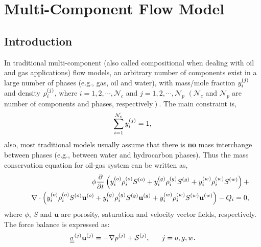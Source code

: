 
\chapter{Multi-Component Flow Model}\label{Chapter:CompositionalModel}


\section{Introduction}\label{Chapter:CompositionalModel:Section:Introduction}
In traditional multi-component (also called compositional when dealing with oil and gas applications) flow models, an arbitrary number of components exist in a large number of phases (e.g., gas, oil and water), with mass/mole fraction $\mfr[y]{i}{j}$ and density $\mfr[\rho]{i}{j}$, where $i = 1, 2, \cdots, \mathcal{N}_{c}$ and $j=1, 2, \cdots, \mathcal{N}_{p}$ $\left(\mathcal{N}_{c}\right.$ and $\mathcal{N}_{p}$ are number of components and phases, respectively$\left.\right)$. The main constraint is,
   \begin{displaymath}
      \summation_{i=1}^{\mathcal{N}_{c}} \mfr[y]{i}{j} = 1,
   \end{displaymath}
also, most traditional models usually assume that there is {\bf no} mass interchange between phases (e.g., between water and hydrocarbon phases). Thus the mass conservation equation for oil-gas system can be written as,
   \begin{eqnarray}
      &&\phi \frc{\partial}{\partial t}\left( \mfr[y]{i}{o} \mfr[\rho]{i}{o} \mfr[S]{}{o} + \mfr[y]{i}{g} \mfr[\rho]{i}{g} \mfr[S]{}{g} +  \mfr[y]{i}{w} \mfr[\rho]{i}{w} \mfr[S]{}{w}\right) + \nonumber \\
        &&\;\;\;\; \nabla \cdot \left(\mfr[y]{i}{o} \mfr[\rho]{i}{o}\mfr[S]{}{o}  \mfr[\mathbf{u}]{}{o} + \mfr[y]{i}{g}\mfr[\rho]{i}{g}\mfr[S]{}{g} \mfr[\mathbf{u}]{}{g} + \mfr[y]{i}{w} \mfr[\rho]{i}{w}\mfr[S]{}{w} \mfr[\mathbf{u}]{}{w} \right) - Q_i = 0, \label{Chapter:CompositionalModel:Eqn:saturation_comp_old}
   \end{eqnarray}
where $\phi$, $S$ and $\mathbf{u}$ are porosity, saturation and velocity vector fields, respectively. The force balance is expressed as:
   \begin{equation}
       \mfr[\underline{\underline{\sigma}}]{}{j} \mfr[\mathbf u]{}{j} = - \nabla \mfr[p]{}{j} + \mfr[\mathcal{S}]{}{j}, ~~~~~ j = o,g,w .\label{Chapter:CompositionalModel:Eqn:ForceBalance}
   \end{equation}
